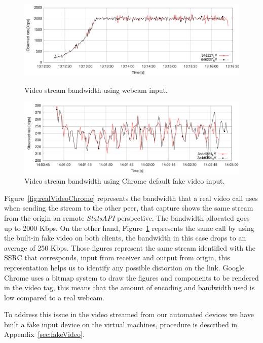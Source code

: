  \begin{figure}[h]
  \centering
   \includegraphics[width=1\textwidth]{./figures/realVideoChrome.pdf}
     \caption[Video stream bandwidth using webcam]{Video stream bandwidth using webcam input.}
	\label{fig:realVideoChrome}
  \centering
	\includegraphics[width=1\textwidth]{./figures/automatedVideoChrome.pdf}
	\caption[Video stream bandwidth using Chrome default fake content]{Video stream bandwidth using Chrome default fake video input.}
	\label{fig:automatedVideoChrome}
\end{figure}

Figure~\ref{fig:realVideoChrome} represents the bandwidth that a real video call uses when sending the stream to the other peer, that capture shows the same stream from the origin an remote {\it StatsAPI} perspective. The bandwidth allocated goes up to 2000 Kbps. On the other hand, Figure~\ref{fig:automatedVideoChrome} represents the same call by using the built-in fake video on both clients, the bandwidth in this case drops to an average of 250 Kbps. Those figures represent the same stream identified with the SSRC that corresponds, input from receiver and output from origin, this representation helps us to identify any possible distortion on the link. Google Chrome uses a bitmap system to draw the figures and components to be rendered in the video tag, this means that the amount of encoding and bandwidth used is low compared to a real webcam.

To address this issue in the video streamed from our automated devices we have built a fake input device on the virtual machines, procedure is described in Appendix~\ref{sec:fakeVideo}.

